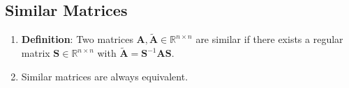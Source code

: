 \subsection{Similar Matrices}

\begin{enumerate}
    \item \textbf{Definition}: Two matrices $\bm{A}, \tilde{\bm{A}} \in \mathbb{R}^{n\times n}$ are similar if there exists a regular matrix $\bm{S} \in \mathbb{R}^{n\times n}$ with $\tilde{\bm{A}} = \bm{S} ^{-1}\bm{AS}$.
    \hfill \cite{mfml/book/mml/Deisenroth-Faisal-Ong}

    \item Similar matrices are always equivalent.
    \hfill \cite{mfml/book/mml/Deisenroth-Faisal-Ong}
\end{enumerate}







